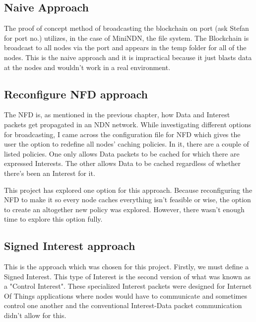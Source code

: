 \subsection{Naive Approach}
The proof of concept method of broadcasting the blockchain on port (ask Stefan for port no.) utilizes, in the case of MiniNDN, the file system. The Blockchain is broadcast to all nodes via the port and appears in the temp folder for all of the nodes. This is the naive approach and it is impractical because it just blasts data at the nodes and wouldn't work in a real environment.

\subsection{Reconfigure NFD approach}
The NFD is, as mentioned in the previous chapter, how Data and Interest packets get propagated in an NDN network. While investigating different options for broadcasting, I came across the configuration file for NFD which gives the user the option to redefine all nodes' caching policies. In it, there are a couple of listed policies. One only allows Data packets to be cached for which there are expressed Interests. The other allows Data to be cached regardless of whether there's been an Interest for it. \par
This project has explored one option for this approach. Because reconfiguring the NFD to make it so every node caches everything isn't feasible or wise, the option to create an altogether new policy was explored. However, there wasn't enough time to explore this option fully.
\subsection{Signed Interest approach}
This is the approach which was chosen for this project. Firstly, we must define a Signed Interest. This type of Interest is the second version of what was known as a "Control Interest". These specialized Interest packets were designed for Internet Of Things applications where nodes would have to communicate and sometimes control one another and the conventional Interest-Data packet communication didn't allow for this.\par

